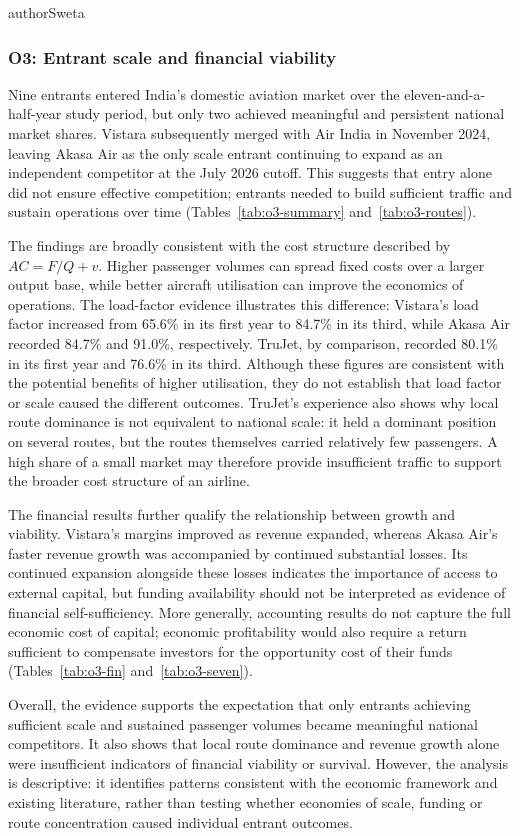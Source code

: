 \begin{mergedcontribution}{authorSweta}
\subsubsection{O3: Entrant scale and financial viability}
\label{sec:review-o3-interpretation}
Nine entrants entered India's domestic aviation market over the eleven-and-a-half-year study period, but only two achieved meaningful and persistent national market shares. Vistara subsequently merged with Air India in November 2024, leaving Akasa Air as the only scale entrant continuing to expand as an independent competitor at the July 2026 cutoff. This suggests that entry alone did not ensure effective competition; entrants needed to build sufficient traffic and sustain operations over time (Tables~\ref{tab:o3-summary} and~\ref{tab:o3-routes}).

The findings are broadly consistent with the cost structure described by $AC=F/Q+v$. Higher passenger volumes can spread fixed costs over a larger output base, while better aircraft utilisation can improve the economics of operations. The load-factor evidence illustrates this difference: Vistara's load factor increased from 65.6\% in its first year to 84.7\% in its third, while Akasa Air recorded 84.7\% and 91.0\%, respectively. TruJet, by comparison, recorded 80.1\% in its first year and 76.6\% in its third. Although these figures are consistent with the potential benefits of higher utilisation, they do not establish that load factor or scale caused the different outcomes. TruJet's experience also shows why local route dominance is not equivalent to national scale: it held a dominant position on several routes, but the routes themselves carried relatively few passengers. A high share of a small market may therefore provide insufficient traffic to support the broader cost structure of an airline.

The financial results further qualify the relationship between growth and viability. Vistara's margins improved as revenue expanded, whereas Akasa Air's faster revenue growth was accompanied by continued substantial losses. Its continued expansion alongside these losses indicates the importance of access to external capital, but funding availability should not be interpreted as evidence of financial self-sufficiency. More generally, accounting results do not capture the full economic cost of capital; economic profitability would also require a return sufficient to compensate investors for the opportunity cost of their funds (Tables~\ref{tab:o3-fin} and~\ref{tab:o3-seven}).

Overall, the evidence supports the expectation that only entrants achieving sufficient scale and sustained passenger volumes became meaningful national competitors. It also shows that local route dominance and revenue growth alone were insufficient indicators of financial viability or survival. However, the analysis is descriptive: it identifies patterns consistent with the economic framework and existing literature, rather than testing whether economies of scale, funding or route concentration caused individual entrant outcomes.
\end{mergedcontribution}

